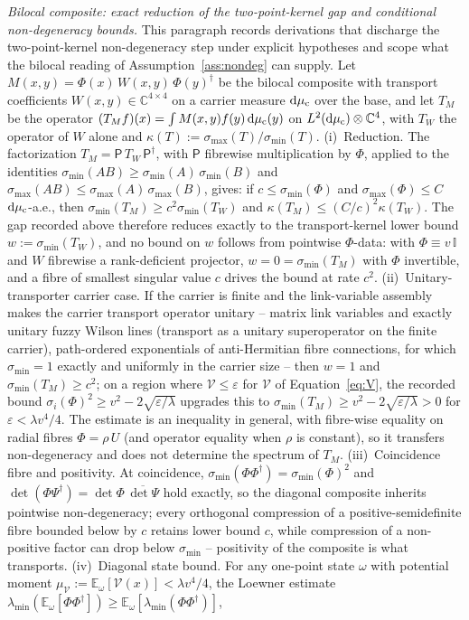 \emph{Bilocal composite: exact reduction of the two-point-kernel gap and conditional non-degeneracy bounds.} This paragraph records derivations that discharge the two-point-kernel non-degeneracy step under explicit hypotheses and scope what the bilocal reading of Assumption~\ref{ass:nondeg} can supply. Let \(M(x,y)=\Phi(x)\,W(x,y)\,\Phi(y)^\dagger\) be the bilocal composite with transport coefficients \(W(x,y)\in\mathbb C^{4\times4}\) on a carrier measure \(\mathrm d\mu_{\rm c}\) over the base, and let \(T_M\) be the operator \((T_M f)(x)=\int M(x,y)f(y)\,\mathrm d\mu_{\rm c}(y)\) on \(L^2(\mathrm d\mu_{\rm c})\otimes\mathbb C^4\), with \(T_W\) the operator of \(W\) alone and \(\kappa(T):=\sigma_{\max}(T)/\sigma_{\min}(T)\). (i)~Reduction. The factorization \(T_M=\mathsf P\,T_W\,\mathsf P^\dagger\), with \(\mathsf P\) fibrewise multiplication by \(\Phi\), applied to the identities \(\sigma_{\min}(AB)\ge\sigma_{\min}(A)\,\sigma_{\min}(B)\) and \(\sigma_{\max}(AB)\le\sigma_{\max}(A)\,\sigma_{\max}(B)\), gives: if \(c\le\sigma_{\min}(\Phi)\) and \(\sigma_{\max}(\Phi)\le C\) \(\mathrm d\mu_{\rm c}\)-a.e., then \(\sigma_{\min}(T_M)\ge c^2\sigma_{\min}(T_W)\) and \(\kappa(T_M)\le(C/c)^2\kappa(T_W)\). The gap recorded above therefore reduces exactly to the transport-kernel lower bound \(w:=\sigma_{\min}(T_W)\), and no bound on \(w\) follows from pointwise \(\Phi\)-data: with \(\Phi\equiv v\,\mathbb I\) and \(W\) fibrewise a rank-deficient projector, \(w=0=\sigma_{\min}(T_M)\) with \(\Phi\) invertible, and a fibre of smallest singular value \(c\) drives the bound at rate \(c^2\). (ii)~Unitary-transporter carrier case. If the carrier is finite and the link-variable assembly makes the carrier transport operator unitary -- matrix link variables and exactly unitary fuzzy Wilson lines (transport as a unitary superoperator on the finite carrier), path-ordered exponentials of anti-Hermitian fibre connections, for which \(\sigma_{\min}=1\) exactly and uniformly in the carrier size -- then \(w=1\) and \(\sigma_{\min}(T_M)\ge c^2\); on a region where \(\mathcal V\le\varepsilon\) for \(\mathcal V\) of Equation~\eqref{eq:V}, the recorded bound \(\sigma_i(\Phi)^2\ge v^2-2\sqrt{\varepsilon/\lambda}\) upgrades this to \(\sigma_{\min}(T_M)\ge v^2-2\sqrt{\varepsilon/\lambda}>0\) for \(\varepsilon<\lambda v^4/4\). The estimate is an inequality in general, with fibre-wise equality on radial fibres \(\Phi=\rho\,U\) (and operator equality when \(\rho\) is constant), so it transfers non-degeneracy and does not determine the spectrum of \(T_M\). (iii)~Coincidence fibre and positivity. At coincidence, \(\sigma_{\min}(\Phi\Phi^\dagger)=\sigma_{\min}(\Phi)^2\) and \(\det(\Phi\Psi^\dagger)=\det\Phi\,\overline{\det\Psi}\) hold exactly, so the diagonal composite inherits pointwise non-degeneracy; every orthogonal compression of a positive-semidefinite fibre bounded below by \(c\) retains lower bound \(c\), while compression of a non-positive factor can drop below \(\sigma_{\min}\) -- positivity of the composite is what transports. (iv)~Diagonal state bound. For any one-point state \(\omega\) with potential moment \(\mu_{\mathcal V}:=\mathbb E_\omega[\mathcal V(x)]<\lambda v^4/4\), the Loewner estimate \(\lambda_{\min}(\mathbb E_\omega[\Phi\Phi^\dagger])\ge\mathbb E_\omega[\lambda_{\min}(\Phi\Phi^\dagger)]\), 